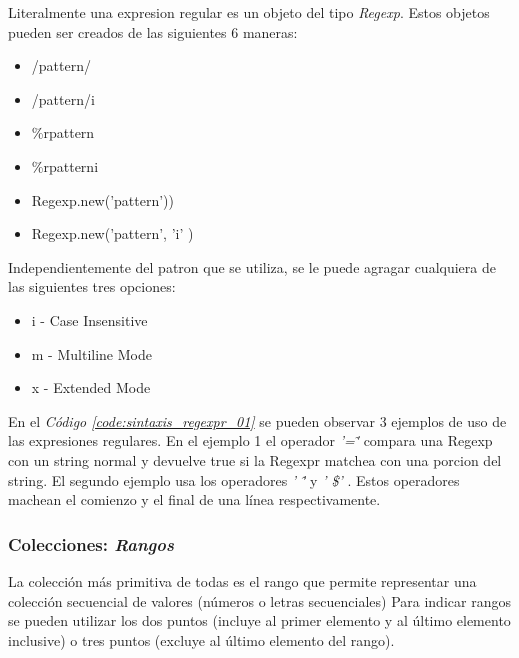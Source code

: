 \documentclass{article}
\newcommand{\refcode}[1]{\textit{Código \ref{#1}}}
\begin{document}
	Literalmente una expresion regular es un objeto del tipo \textit{Regexp}. Estos objetos pueden ser creados de las siguientes 6 maneras:

\begin{itemize}
	\itemsep=1pt \topsep=0pt \partopsep=0pt \parskip=0pt \parsep=0pt
	\item  /pattern/              
	\item  /pattern/i 
	\item  \%r{pattern}
	\item \%r{pattern}i
	\item  Regexp.new('pattern'))
	\item  Regexp.new('pattern', 'i' )
\end{itemize}

	Independientemente del patron que se utiliza, se le puede agragar cualquiera de las siguientes tres opciones:

\begin{itemize}
	\itemsep=1pt \topsep=0pt \partopsep=0pt \parskip=0pt \parsep=0pt
	 \item  i  - Case Insensitive
	 \item m  - Multiline Mode
	 \item x  - Extended Mode
\end{itemize}
	
\noindent En el \refcode{code:sintaxis_regexpr_01} se pueden observar 3 ejemplos de uso de las expresiones regulares. En el ejemplo 1 el operador \textit{ '=\~'}  compara una Regexp con un string normal y devuelve true si la Regexpr matchea con una porcion del string. El segundo ejemplo usa los operadores \textit{' \^'} y \textit{ ' \$'} . Estos operadores machean el comienzo y el final de una línea respectivamente.

 
\bigskip


\subsubsection{Colecciones: \textit{Rangos}}
La colección más primitiva de todas es el rango que permite representar una colección secuencial de valores (números o letras secuenciales)
Para indicar rangos se pueden utilizar los dos puntos (incluye al primer elemento y al último elemento inclusive) o tres puntos (excluye al último elemento del rango).

 
\bigskip
\end{document}
